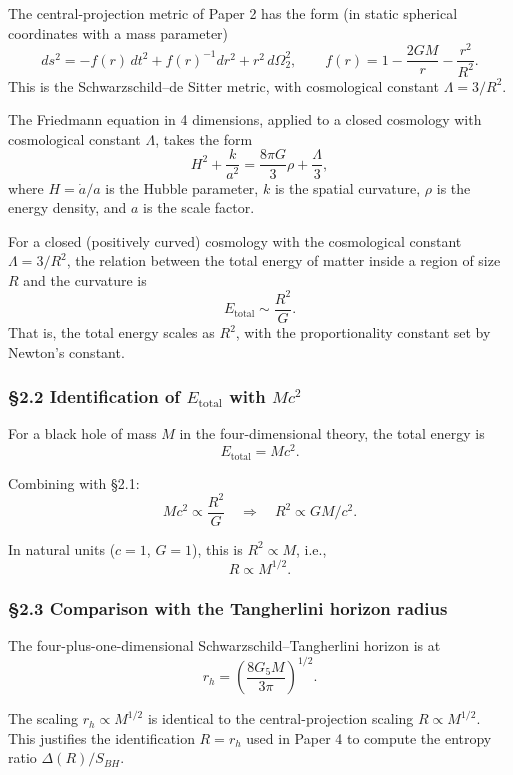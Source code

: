 \documentclass[a4paper,11pt]{article}
\theoremstyle{definition}
\begin{document}
The central-projection metric of Paper 2 has the form (in static
spherical coordinates with a mass parameter)
\[ds^2 = -f(r)\, dt^2 + f(r)^{-1} dr^2 + r^2\, d\Omega_2^2, \qquad f(r) = 1 - \frac{2GM}{r} - \frac{r^2}{R^2}.\]
This is the Schwarzschild--de Sitter metric, with cosmological constant
\(\Lambda = 3/R^2\).

The Friedmann equation in 4 dimensions, applied to a closed cosmology
with cosmological constant \(\Lambda\), takes the form
\[H^2 + \frac{k}{a^2} = \frac{8\pi G}{3} \rho + \frac{\Lambda}{3},\]
where \(H = \dot a/a\) is the Hubble parameter, \(k\) is the spatial
curvature, \(\rho\) is the energy density, and \(a\) is the scale
factor.

For a closed (positively curved) cosmology with the cosmological
constant \(\Lambda = 3/R^2\), the relation between the total energy of
matter inside a region of size \(R\) and the curvature is
\[E_{\mathrm{total}} \sim \frac{R^2}{G}.\] That is, the total energy
scales as \(R^2\), with the proportionality constant set by Newton's
constant.

\subsubsection{\texorpdfstring{§2.2 Identification of
\(E_{\mathrm{total}}\) with
\(M c^2\)}{§2.2 Identification of E\_\{\textbackslash mathrm\{total\}\} with M c\^{}2}}\label{identification-of-e_mathrmtotal-with-m-c2}

For a black hole of mass \(M\) in the four-dimensional theory, the total
energy is \[E_{\mathrm{total}} = M c^2.\]

Combining with §2.1:
\[M c^2 \propto \frac{R^2}{G} \quad \Longrightarrow \quad R^2 \propto G M / c^2.\]

In natural units (\(c = 1\), \(G = 1\)), this is \(R^2 \propto M\),
i.e., \[\boxed{\;R \propto M^{1/2}.\;}\]

\subsubsection{§2.3 Comparison with the Tangherlini horizon
radius}\label{comparison-with-the-tangherlini-horizon-radius}

The four-plus-one-dimensional Schwarzschild--Tangherlini horizon is at
\[r_h = \left(\frac{8 G_5 M}{3\pi}\right)^{1/2}.\]

The scaling \(r_h \propto M^{1/2}\) is identical to the
central-projection scaling \(R \propto M^{1/2}\). This justifies the
identification \(R = r_h\) used in Paper 4 to compute the entropy ratio
\(\Delta(R)/S_{BH}\).
\end{document}
